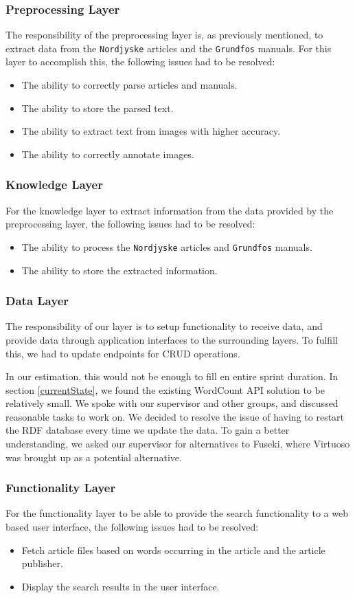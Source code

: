 \subsubsection*{Preprocessing Layer}
The responsibility of the preprocessing layer is, as previously mentioned, to extract data from the \texttt{Nordjyske} articles and the \texttt{Grundfos} manuals. For this layer to accomplish this, the following issues had to be resolved:
\begin{itemize}
    \item The ability to correctly parse articles and manuals.
    \item The ability to store the parsed text.
    \item The ability to extract text from images with higher accuracy.
    \item The ability to correctly annotate images.
\end{itemize}

\subsubsection*{Knowledge Layer}
For the knowledge layer to extract information from the data provided by the preprocessing layer, the following issues had to be resolved:
\begin{itemize}
    \item The ability to process the \texttt{Nordjyske} articles and \texttt{Grundfos} manuals.
    \item The ability to store the extracted information.
\end{itemize}

\subsubsection*{Data Layer}
The responsibility of our layer is to setup functionality to receive data, and provide data through application interfaces to the surrounding layers.
To fulfill this, we had to update endpoints for CRUD operations.

In our estimation, this would not be enough to fill en entire sprint duration. In section \ref{currentState}, we found the existing WordCount API solution to be relatively small.
We spoke with our supervisor and other groups, and discussed reasonable tasks to work on. We decided to resolve the issue of having to restart the RDF database every time we update the data. To gain a better understanding, we asked our supervisor for alternatives to Fuseki, where Virtuoso was brought up as a potential alternative.

\subsubsection*{Functionality Layer}
For the functionality layer to be able to provide the search functionality to a web based user interface, the following issues had to be resolved:
\begin{itemize}
    \item Fetch article files based on words occurring in the article and the article publisher.
    \item Display the search results in the user interface.
\end{itemize}